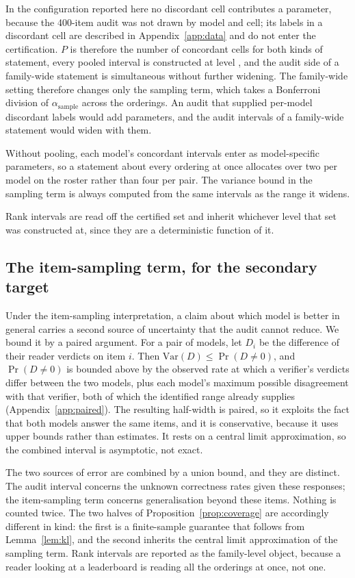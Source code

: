 In the configuration reported here no discordant cell contributes a parameter, because the
400-item audit was not drawn by model and cell; its labels in a discordant cell are described in
Appendix~\ref{app:data} and do not enter the certification. $P$ is therefore the number of
concordant cells for both kinds of statement, every pooled interval is constructed at level
\SidakTwoLevel{}, and the audit side of a family-wide statement is simultaneous without
further widening. The family-wide setting therefore changes only the sampling term, which
takes a Bonferroni division of $\alpha_{\mathrm{sample}}$ across the \NumOrderings{}
orderings. An audit that supplied per-model discordant labels would add parameters, and the audit
intervals of a family-wide statement would widen with them.

Without pooling, each model's concordant intervals enter as model-specific parameters, so a
statement about every ordering at once allocates over two per model on the roster rather than
four per pair. The variance bound in the sampling term is always computed from the same
intervals as the range it widens.

Rank intervals are read off the certified set and inherit whichever level that set was
constructed at, since they are a deterministic function of it.

\subsection{The item-sampling term, for the secondary target}

Under the item-sampling interpretation, a claim about which model is better in general carries
a second source of uncertainty that the audit cannot reduce. We bound it by a paired argument.
For a pair of models, let $D_i$ be the difference of their reader verdicts on item $i$. Then $\mathrm{Var}(D) \le \Pr(D \neq 0)$, and $\Pr(D \neq 0)$ is bounded above by the
observed rate at which a verifier's verdicts differ between the two models, plus each model's
maximum possible disagreement with that verifier, both of which the identified range already
supplies (Appendix~\ref{app:paired}). The resulting half-width is paired, so it exploits the
fact that both models answer the same items, and it is conservative, because it uses upper
bounds rather than estimates. It rests on a central limit approximation, so the combined
interval is asymptotic, not exact.

The two sources of error are combined by a union bound, and they are distinct. The audit
interval concerns the unknown correctness rates given these responses; the item-sampling term
concerns generalisation beyond these items. Nothing is counted twice. The two halves of
Proposition~\ref{prop:coverage} are accordingly different in kind: the first is a finite-sample
guarantee that follows from Lemma~\ref{lem:kl}, and the second inherits the central limit
approximation of the sampling term. Rank intervals are reported as the family-level object,
because a reader looking at a leaderboard is reading all the orderings at once, not one.


